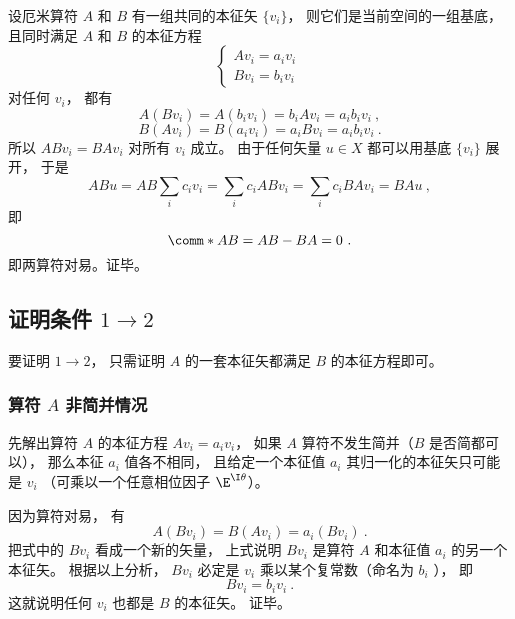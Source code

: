 设厄米算符 $A$ 和 $B$ 有一组共同的本征矢 $\{v_i\}$， 则它们是当前空间的一组基底， 且同时满足 $A$ 和 $B$ 的本征方程
\begin{equation}
\begin{cases}
A v_i = a_i v_i\\
B v_i = b_i v_i
\end{cases}~
\end{equation}
对任何 $v_i$，  都有
\begin{equation}
A (B v_i) = A (b_i v_i) = b_iA v_i = a_i b_i v_i~,
\end{equation}
\begin{equation}
B (A v_i) = B (a_i v_i) = a_i B v_i = a_i b_i v_i~.
\end{equation}
所以 $AB v_i = BA v_i$ 对所有 $v_i$ 成立。 由于任何矢量 $u \in X$ 都可以用基底 $\{v_i\}$ 展开， 于是
\begin{equation}
AB u = AB \sum_i c_i v_i = \sum_i c_i  AB v_i = \sum_i c_i BA v_i = BA u~,
\end{equation}
即
\begin{equation}
\comm*{A}{B} = AB - BA = 0~.
\end{equation}
即两算符对易。证毕。

\subsection{证明条件 $1 \to 2$}

要证明 $1 \to 2$，  只需证明 $A$ 的一套本征矢都满足 $B$ 的本征方程即可。

\subsubsection{算符 $A$ 非简并情况}

先解出算符 $A$ 的本征方程 $A v_i = a_i v_i$，  如果 $A$ 算符不发生简并（$B$ 是否简都可以）， 那么本征 $a_i$ 值各不相同， 且给定一个本征值 $a_i$ 其归一化的本征矢只可能是 $v_i$ （可乘以一个任意相位因子 $\E^{\I\theta}$）。

因为算符对易， 有
\begin{equation}
A (B v_i) = B (A v_i) = a_i (B v_i)~.
\end{equation}
把式中的 $B v_i$ 看成一个新的矢量， 上式说明 $B v_i$ 是算符 $A$ 和本征值 $a_i$ 的另一个本征矢。 根据以上分析， $B v_i$ 必定是 $v_i$ 乘以某个复常数（命名为 $b_i$ ）， 即
\begin{equation}
B v_i = b_i v_i~.
\end{equation}
这就说明任何 $v_i$ 也都是 $B$ 的本征矢。 证毕。

